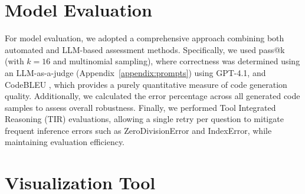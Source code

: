 \section{Model Evaluation}

For model evaluation, we adopted a comprehensive approach combining both automated and LLM-based assessment methods. Specifically, we used pass@k \cite{Levi2024SimpleModelInferenceScalingLaws} (with $k=16$ and multinomial sampling), where correctness was determined using an LLM-as-a-judge \cite{Li2025LLMJudge} (Appendix~\ref{appendix:prompts}) using GPT-4.1, and CodeBLEU \cite{Ren2020CodeBLEU}, which provides a purely quantitative measure of code generation quality. Additionally, we calculated the error percentage across all generated code samples to assess overall robustness. Finally, we performed Tool Integrated Reasoning (TIR) \cite{Fleureau2024NuminaMath} evaluations, allowing a single retry per question to mitigate frequent inference errors such as ZeroDivisionError and IndexError, while maintaining evaluation efficiency.






\section{Visualization Tool}


